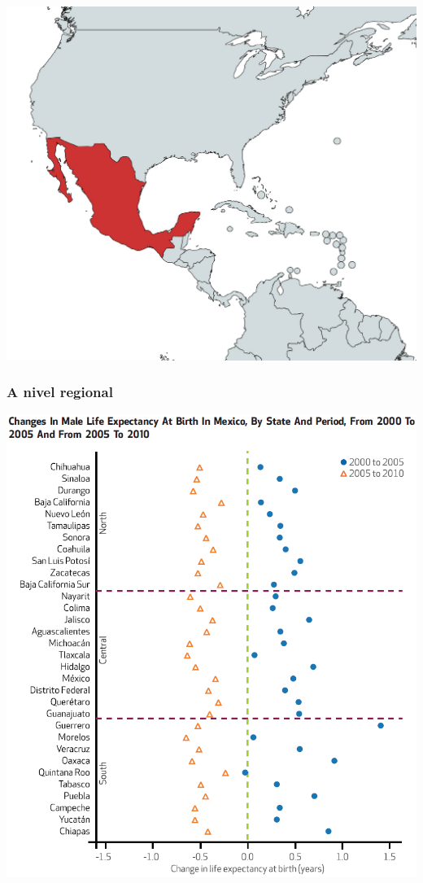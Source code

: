 \documentclass[xcolor={dvipsnames}]{beamer}
\begin{document}
\begin{frame}

				\begin{center}
		\includegraphics[scale=.3]{Figures/Mexico1}
				\end{center}
				
\end{frame}




\begin{frame}\frametitle{A nivel regional}


				\begin{center}
		\includegraphics[scale=.37]{Figures/State_changes_e0}
				\end{center}
				
\end{frame}
\end{document}

